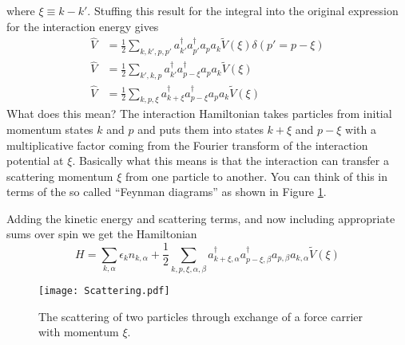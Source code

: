 \documentclass{article}
\begin{document}
where $\xi\equiv k-k'$.
Stuffing this result for the integral into the original expression for the interaction energy gives
\begin{align}
\hat{V} & = \frac{1}{2}\sum_{k,k',p,p'}a_{k'}^{\dagger}a_{p'}^{\dagger}a_{p}a_{k}\tilde{V}(\xi)\delta(p'=p-\xi)\\
\hat{V} & = \frac{1}{2}\sum_{k',k,p}a_{k'}^{\dagger}a_{p-\xi}^{\dagger}a_{p}a_{k}\tilde{V}(\xi)\\
\hat{V} & = \frac{1}{2}\sum_{k,p,\xi}a_{k+\xi}^{\dagger}a_{p-\xi}^{\dagger}a_{p}a_{k}\tilde{V}(\xi)
\end{align}
What does this mean?
The interaction Hamiltonian takes particles from initial momentum states $k$ and $p$ and puts them into states
$k+\xi$ and $p-\xi$ with a multiplicative factor coming from the Fourier transform of the interaction potential at $\xi$.
Basically what this means is that the interaction can transfer a scattering momentum $\xi$ from one particle to another.
You can think of this in terms of the so called ``Feynman diagrams'' as shown in Figure \ref{Flo:scattering}.

Adding the kinetic energy and scattering terms, and now including appropriate sums over spin we get the Hamiltonian
\begin{equation}
H=\sum_{k,\alpha}\epsilon_{k}n_{k,\alpha}+\frac{1}{2}\sum_{k,p,\xi,\alpha,\beta}a_{k+\xi,\alpha}^{\dagger}a_{p-\xi,\beta}^{\dagger}a_{p,\beta}a_{k,\alpha}\tilde{V}(\xi)
\end{equation}

\begin{figure}

\begin{centering}
\texttt{[image: Scattering.pdf]}
\par\end{centering}

\caption{The scattering of two particles through exchange of a force carrier
with momentum $\xi$.}
\label{Flo:scattering}
\end{figure}
\end{document}
